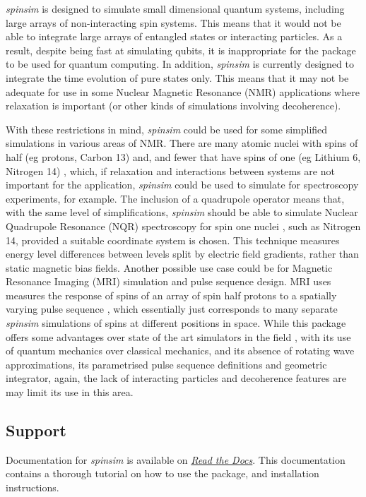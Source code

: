 \documentclass{jors}
\begin{document}
		\emph{spinsim} is designed to simulate small dimensional quantum systems, including large arrays of non-interacting spin systems.
		This means that it would not be able to integrate large arrays of entangled states or interacting particles.
		As a result, despite being fast at simulating qubits, it is inappropriate for the package to be used for quantum computing.
		In addition, \emph{spinsim} is currently designed to integrate the time evolution of pure states only.
		This means that it may not be adequate for use in some Nuclear Magnetic Resonance (NMR) applications where relaxation \cite{veshtort_spinevolution_2006} is important (or other kinds of simulations involving decoherence).

		With these restrictions in mind, \emph{spinsim} could be used for some simplified simulations in various areas of NMR.
		There are many atomic nuclei with spins of half (eg protons, Carbon 13) and, and fewer that have spins of one (eg Lithium 6, Nitrogen 14) \cite{fuller_nuclear_1976}, which, if relaxation and interactions between systems are not important for the application, \emph{spinsim} could be used to simulate for spectroscopy experiments, for example.
		The inclusion of a quadrupole operator means that, with the same level of simplifications, \emph{spinsim} should be able to simulate Nuclear Quadrupole Resonance (NQR) spectroscopy for spin one nuclei \cite{bain_nqr_2004}, such as Nitrogen 14, provided a suitable coordinate system is chosen.
		This technique measures energy level differences between levels split by electric field gradients, rather than static magnetic bias fields.
		Another possible use case could be for Magnetic Resonance Imaging (MRI) simulation and pulse sequence design.
		MRI uses measures the response of spins of an array of spin half protons to a spatially varying pulse sequence \cite{mckinnon_physics_1998}, which essentially just corresponds to many separate \emph{spinsim} simulations of spins at different positions in space.
		While this package offers some advantages over state of the art simulators in the field \cite{kose_fast_2019}, with its use of quantum mechanics over classical mechanics, and its absence of rotating wave approximations, its parametrised pulse sequence definitions and geometric integrator, again, the lack of interacting particles and decoherence features are may limit its use in this area.

	\subsection{Support}
		Documentation for \emph{spinsim} is available on \href{https://spinsim.readthedocs.io/en/latest/}{\emph{Read the Docs}}.
		This documentation contains a thorough tutorial on how to use the package, and installation instructions.
		
\end{document}
